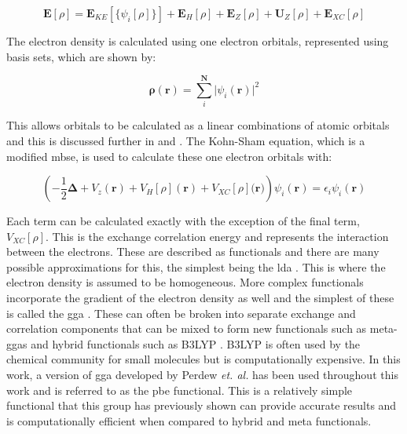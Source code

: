 \begin{equation}
\boldsymbol{E}[\rho] = \boldsymbol{E}_{KE}[\{\psi_i[\rho]\}] + \boldsymbol{E}_{H}[\rho] + \boldsymbol{E}_{Z}[\rho] + \boldsymbol{U}_{Z}[\rho] + \boldsymbol{E}_{XC}[\rho]
\end{equation}

The electron density is calculated using one electron orbitals, represented using basis sets, which are shown by:

\begin{equation}
\boldsymbol{\rho}(\mathbf{r}) = \sum_{i}^{\boldsymbol{N}} \lvert {\psi_i(\mathbf{r})} \rvert ^2
\end{equation}

This allows orbitals to be calculated as a linear combinations of atomic orbitals and this is discussed further in  and . The Kohn\nobreakdash-Sham equation, which is a modified \acrshort{mbse}, is used to calculate these one electron orbitals with:

\begin{equation}
\left( -\frac{1}{2}\boldsymbol{\Delta} + V_z(\mathbf{r}) + V_H[\rho](\mathbf{r}) + V_{XC}[\rho](\mathbf{r)}\right) \psi_i(\mathbf{r}) =  \epsilon_i \psi_i (\mathbf{r})
\end{equation}

Each term can be calculated exactly with the exception of the final term, \(V_{XC}[\rho]\). This is the exchange correlation energy and represents the interaction between the electrons. These are described as functionals and there are many possible approximations for this, the simplest being the \acrfull{lda} \cite{Sahni1988}. This is where the electron density is assumed to be homogeneous. More complex functionals incorporate the gradient of the electron density as well and the simplest of these is called the \acrfull{gga} \cite{Perdew1996}. These can often be broken into separate exchange and correlation components that can be mixed to form new functionals such as meta\nobreakdash-\acrshort{gga}s \cite{Furness2021} and hybrid functionals such as B3LYP \cite{Stephens1994}. B3LYP is often used by the chemical community for small molecules but is computationally expensive. In this work, a version of \acrshort{gga} developed by Perdew \textit{et. al.} \cite{Perdew1996_2} has been used throughout this work and is referred to as the \acrfull{pbe} functional. This is a relatively simple functional that this group has previously shown can provide accurate results and is computationally efficient when compared to hybrid and meta functionals.

